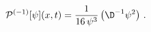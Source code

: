 \begin{equation*}
{\mathcal{P}}^{(-1)}[\psi](x,t) = \frac{1}{16\,\psi^3}\left(\D^{-1}
\psi^2\right)\,.
\end{equation*}

